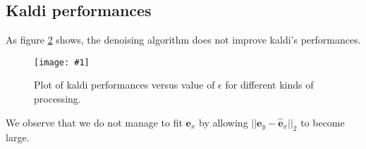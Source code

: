 \documentclass[a4paper]{report}
\newcommand{\img}[3]{\begin{figure}[!h] \centering \texttt{[image: \#1]}\captionsetup{justification=centering} \caption{#3} \label{#1} \end{figure}}
\newcommand{\ey}{\textbf{e}_y}
\newcommand{\ex}{\textbf{e}_x}
\newcommand{\exhat}{ \hat{\textbf{e}}_x }
\newcommand{\scale}{0.4}
\begin{document}
\begin{figure}[!ht]
\centering
{}
\caption{}
\label{sparseparam}
\end{figure}

\subsection{Kaldi performances}


As figure \ref{kaldiperformances} shows, the denoising algorithm does not improve kaldi's performances.
\img{kaldiperformances}{.5}{Plot of kaldi performances versus value of $\epsilon$ for different kinds of processing.}

We observe that we do not manage to fit $\ex$ by allowing $||\ey-\exhat||_2$ to become large.



\end{document}
